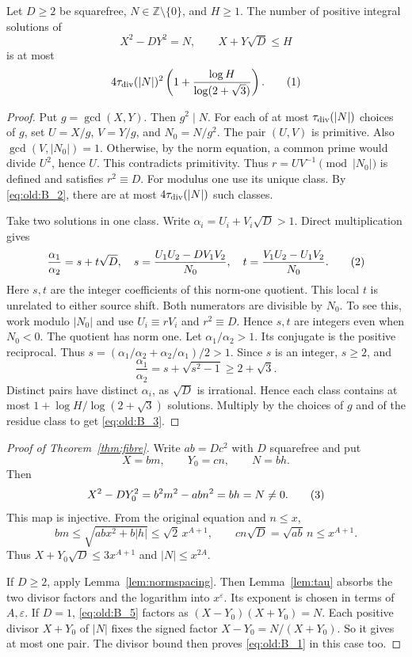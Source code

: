 \begin{lemma}\label{lem:normspacing}
Let \(D\ge2\) be squarefree, \(N\in\mathbb Z\setminus\{0\}\), and \(H\ge1\). The number of
positive integral solutions of
\[
 X^2-DY^2=N,\qquad X+Y\sqrt D\le H
\]
is at most
\[
 4\tauDiv(|N|)^2
 \left(1+\frac{\log H}{\log(2+\sqrt3)}\right).
\AutoTag{eq:old:B_3}
\]
\end{lemma}
\begin{proof}
Put \(g=\gcd(X,Y)\). Then \(g^2\mid N\). For each of at most
\(\tau_{\mathrm{div}}(|N|)\) choices of \(g\), set \(U=X/g\), \(V=Y/g\),
and \(N_0=N/g^2\). The pair \((U,V)\) is primitive. Also
\(\gcd(V,|N_0|)=1\). Otherwise, by the norm equation, a common prime
would divide \(U^2\), hence \(U\). This contradicts primitivity. Thus
\(r=UV^{-1}\pmod{|N_0|}\) is defined and satisfies \(r^2\equiv D\).
For modulus one use its unique class. By \eqref{eq:old:B_2}, there are at most
\(4\tau_{\mathrm{div}}(|N|)\) such classes.

Take two solutions in one class. Write
\(\alpha_i=U_i+V_i\sqrt D>1\). Direct multiplication gives
\[
 \frac{\alpha_1}{\alpha_2}=s+t\sqrt D,\quad
 s=\frac{U_1U_2-DV_1V_2}{N_0},\quad
 t=\frac{V_1U_2-U_1V_2}{N_0}.
\AutoTag{eq:old:B_4}
\]
Here \(s,t\) are the integer coefficients of this norm-one quotient.
This local \(t\) is unrelated to either source shift.
Both numerators are divisible by \(N_0\). To see this, work modulo \(|N_0|\) and use
\(U_i\equiv rV_i\) and \(r^2\equiv D\). Hence \(s,t\) are integers
even when \(N_0<0\). The quotient has norm one. Let
\(\alpha_1/\alpha_2>1\). Its conjugate is the positive reciprocal. Thus
\(s=(\alpha_1/\alpha_2+\alpha_2/\alpha_1)/2>1\). Since \(s\) is an
integer, \(s\ge2\), and
\[
 \frac{\alpha_1}{\alpha_2}=s+\sqrt{s^2-1}\ge2+\sqrt3.
\]
Distinct pairs have distinct \(\alpha_i\), as \(\sqrt D\) is irrational.
Hence each class contains at most
\(1+\log H/\log(2+\sqrt3)\) solutions. Multiply by the choices of
\(g\) and of the residue class to get \eqref{eq:old:B_3}.
\end{proof}

\begin{proof}[Proof of Theorem~\ref{thm:fibre}]
Write \(ab=Dc^2\) with \(D\) squarefree and put
\[
 X=bm,\qquad Y_0=cn,\qquad N=bh.
\]
Then
\[
 X^2-DY_0^2=b^2m^2-abn^2=bh=N\ne0.
\AutoTag{eq:old:B_5}
\]
This map is injective. From the original equation and \(n\le x\),
\[
 bm\le\sqrt{abx^2+b|h|}\le\sqrt2\,x^{A+1},\qquad
 cn\sqrt D=\sqrt{ab}\,n\le x^{A+1}.
\]
Thus \(X+Y_0\sqrt D\le3x^{A+1}\) and \(|N|\le x^{2A}\).

If \(D\ge2\), apply Lemma~\ref{lem:normspacing}. Then Lemma~\ref{lem:tau}
absorbs the two divisor factors and the logarithm into \(x^\varepsilon\). Its
exponent is chosen in terms of \(A,\varepsilon\). If \(D=1\), \eqref{eq:old:B_5} factors
as \((X-Y_0)(X+Y_0)=N\). Each positive divisor \(X+Y_0\) of
\(|N|\) fixes the signed factor \(X-Y_0=N/(X+Y_0)\). So it gives at
most one pair. The divisor bound then proves \eqref{eq:old:B_1} in this case too.
\end{proof}

